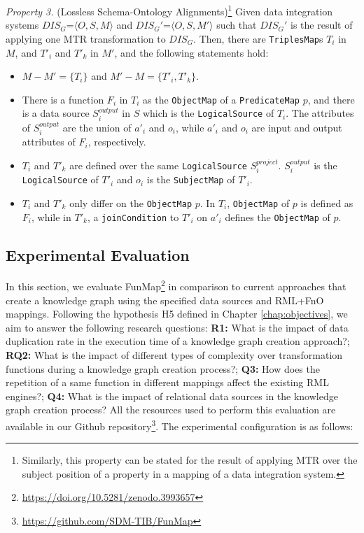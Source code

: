 \noindent\textit{Property 3.} (Lossless Schema-Ontology Alignments)\footnote{Similarly, this property can be stated for the result of applying MTR over the subject position of a property in a mapping of a data integration system.}
\label{property:p3}
Given data integration systems $DIS_G$=$\langle O,S,M\rangle$ and  $DIS_G'$=$\langle O,S,M'\rangle$ such that $DIS_G'$ is the result of applying one MTR transformation to $DIS_G$. Then, there are \verb|TriplesMap|s $T_i$ in $M$, 
and  $T'_i$ and $T'_k$ in $M'$, and the following statements hold:
\begin{itemize}
    \item $M - M'=\{T_i\}$ and $M'- M=\{T'_i,T'_k\}$. 
    \item There is a function $F_i$ in $T_i$ as the \verb|ObjectMap| of a  \verb|PredicateMap| $p$, and there is a data source $S_i^{output}$ in $S$ which is the \verb|LogicalSource| of $T_i$. The attributes of $S_i^{output}$ are the union of $a'_i$ and $o_i$, while $a'_i$ and $o_i$ are input and output attributes of $F_i$, respectively.
    \item $T_i$ and $T'_k$ are defined over the same \verb|LogicalSource|  $S_i^{project}$. $S_i^{output}$ is the \verb|LogicalSource| of $T'_i$ and $o_i$ is the \verb|SubjectMap| of $T'_i$.  
    \item $T_i$ and $T'_k$ only differ on the \verb|ObjectMap| $p$. In $T_i$, \verb|ObjectMap| of $p$ is defined as $F_i$, while in $T'_k$, a \verb|joinCondition| to $T'_i$ on $a'_i$ defines the \verb|ObjectMap| of $p$. 
\end{itemize}


\subsection{Experimental Evaluation}

In this section, we evaluate FunMap\footnote{\url{https://doi.org/10.5281/zenodo.3993657}} in comparison to current approaches that create a knowledge graph using the specified data sources and RML+FnO mappings. Following the hypothesis H5 defined in Chapter \ref{chap:objectives}, we aim to answer the following research questions: 
\textbf{R1:} What is the impact of data duplication rate in the execution time of a knowledge graph creation approach?; \textbf{RQ2:} What is the impact of different types of complexity over transformation functions during a knowledge graph creation process?; \textbf{Q3:} How does the repetition of a same function in different mappings affect the existing RML engines?; \textbf{Q4:} What is the impact of relational data sources in the knowledge graph creation process?
All the resources used to perform this evaluation are available in our Github repository\footnote{\url{https://github.com/SDM-TIB/FunMap}}. The experimental configuration is as follows:

